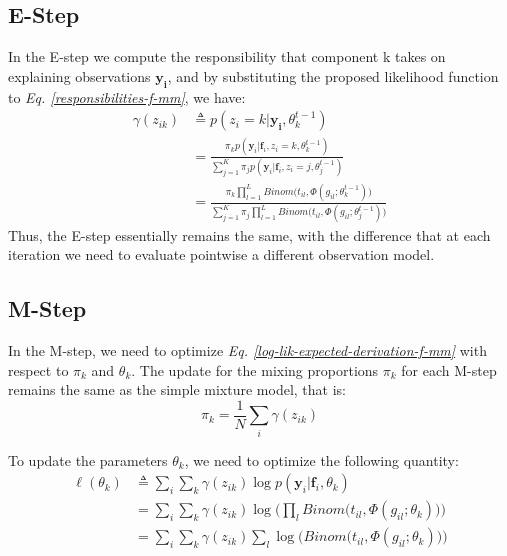 \subsection{E-Step}
In the E-step we compute the responsibility that component k takes on explaining observations $\mathbf{y_{i}}$, and by substituting the proposed likelihood function to \emph{Eq. \ref{responsibilities-f-mm}}, we have:
\begin{equation} \label{responsibilities-binom-prob-model-f-meth}
  \begin{split}
	\gamma(z_{ik}) & \triangleq p(z_{i}=k|\mathbf{y_{i}},\theta_{k}^{t-1}) \\
				   & = \frac{\pi_{k}p(\mathbf{y}_{i}|\mathbf{f}_{i},z_{i}=k,\theta_{k}^{t-1})}{\sum\limits_{j=1}^{K} \pi_{j}p(\mathbf{y}_{i}|\mathbf{f}_{i},z_{i}=j,\theta_{j}^{t-1})} \\
				   & = \frac{\pi_{k} \prod\limits_{l=1}^{L} Binom \big(t_{il}, \Phi(g_{il}; \theta_{k}^{t-1})\big)} {\sum\limits_{j=1}^{K} \pi_{j} \prod\limits_{l=1}^{L} Binom \big(t_{il}, \Phi(g_{il}; \theta_{j}^{t-1})\big)}
  \end{split}
\end{equation}
Thus, the E-step essentially remains the same, with the difference that at each iteration we need to evaluate pointwise a different observation model. 

\subsection{M-Step}
In the M-step, we need to optimize \emph{Eq. \ref{log-lik-expected-derivation-f-mm}} with respect to $\pi_{k}$ and $\theta_{k}$. The update for the mixing proportions $\pi_{k}$ for each M-step remains the same as the simple mixture model, that is:
\begin{equation} \label{mixing-proportions-binom-prob-est-f-meth}
		\pi_{k} = \frac{1}{N} \sum_{i} \gamma(z_{ik})
\end{equation}

To update the parameters $\theta_{k}$, we need to optimize the following quantity:
\begin{equation} \label{parameters-est2-binom-prob-EM-f-meth}
  \begin{split}
	\ell(\theta_{k}) & \triangleq \sum_{i} \sum_{k} \gamma(z_{ik}) \log p(\mathbf{y}_{i}|\mathbf{f}_{i}, \theta_{k}) \\
					 & = \sum_{i} \sum_{k} \gamma(z_{ik}) \log \bigg( \prod_{l} Binom \big(t_{il}, \Phi(g_{il}; \theta_{k})\big) \bigg)\\
					 & = \sum_{i} \sum_{k} \gamma(z_{ik}) \sum_{l} \log \bigg(Binom \big(t_{il}, \Phi(g_{il}; \theta_{k})\big) \bigg)
  \end{split}
\end{equation}

